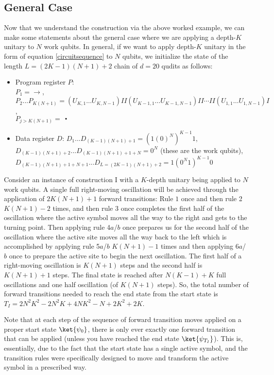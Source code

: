 \documentclass[11pt,letterpaper]{article}
\newcommand{\<}{\langle}
\renewcommand{\>}{\rangle}
\newcommand{\bul}{\:\:\centerdot\:}       %
\begin{document}
\subsection{General Case}\label{uogsec}

Now that we understand the construction via the above worked example, we can make some statements about the general case where we are applying a depth-$K$ unitary to $N$ work qubits. In general, if we want to apply depth-$K$ unitary in the form of equation \ref{circuitsequence} to $N$ qubits, we initialize the state of the length $L=(2K-1)(N+1)+2$ chain of $d=20$ qudits as follows:
\begin{itemize}
	\item Program register $P$: \\$P_1=\rightarrow$, $P_2 ... P_{K(N+1)}=(U_{K,1}\dots U_{K,N-1})II(U_{K-1,1}\dots U_{K-1,N-1})II \cdots II(U_{1,1}\dots U_{1,N-1})I$,\\ $P_{j>K(N+1)}=\bul$
	\item Data register $D$: $D_1...D_{(K-1)(N+1)+1}=(1(0)^N)^{K-1}1$, $D_{(K-1)(N+1)+2}...D_{(K-1)(N+1)+1+N}=0^N$ (these are the work qubits), $D_{(K-1)(N+1)+1+N+1}...D_{L=(2K-1)(N+1)+2}=1(0^N1)^{K-1}0$
\end{itemize}

Consider an instance of construction I with a $K$-depth unitary being applied to $N$ work qubits. A single full right-moving oscillation will be achieved through the application of $2K(N+1)+1$ forward transitions: Rule $1$ once and then rule 2 $K(N+1)-2$ times, and then rule 3 once completes the first half of the oscillation where the active symbol moves all the way to the right and gets to the turning point. Then applying rule 4$a$/$b$ once prepares us for the second half of the oscillation where the active site moves all the way back to the left which is accomplished by applying rule 5$a$/$b$ $K(N+1)-1$ times and then applying 6$a$/$b$ once to prepare the active site to begin the next oscillation. The first half of a right-moving oscillation is $K(N+1)$ steps and the second half is $K(N+1)+1$ steps. The final state is reached after $N(K-1)+K$ full oscillations and one half oscillation (of $K(N+1)$ steps). So, the total number of forward transitions needed to reach the end state from the start state is $T_{I}=2N^2K^2-2N^2K+4NK^2-N+2K^2+2K$.

Note that at each step of the sequence of forward transition moves applied on a proper start state $\ket{\psi_0}$, there is only ever exactly one forward transition that can be applied (unless you have reached the end state $\ket{\psi_{T_I}}$). This is, essentially, due to the fact that the start state has a single active symbol, and the transition rules were specifically designed to move and transform the active symbol in a prescribed way.
\end{document}
